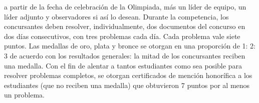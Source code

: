  a partir de la fecha de celebración de la Olimpiada, más un líder de equipo, un líder adjunto y observadores si así lo desean. Durante la competencia, los concursantes deben resolver, individualmente, dos documentos del concurso en dos días consecutivos, con tres problemas cada día. Cada problema vale siete puntos. Las medallas de oro, plata y bronce se otorgan en una proporción de 1: 2: 3 de acuerdo con los resultados generales: la mitad de los concursantes reciben una medalla. Con el fin de alentar a tantos estudiantes como sea posible para resolver problemas completos, se otorgan certificados de mención honorífica a los estudiantes (que no reciben una medalla) que obtuvieron 7 puntos por al menos un problema.

